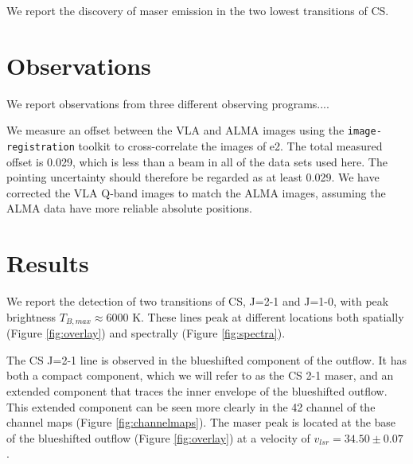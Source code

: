 \documentclass[twocolumn]{aastex62}
\begin{document}
We report the discovery of maser emission in the two lowest transitions of CS.

\section{Observations}
We report observations from three different observing programs....

We measure an offset between the VLA and ALMA images using
the \texttt{image-registration} toolkit to cross-correlate the images
of e2.  The total measured offset is 0.029\arcsec, which is less than
a beam in all of the data sets used here.  The pointing uncertainty should
therefore be regarded as at least 0.029\arcsec.  We have corrected
the VLA Q-band images to match the ALMA images, assuming the ALMA
data have more reliable absolute positions.

\section{Results}
We report the detection of two transitions of CS, J=2-1 and J=1-0, with
peak brightness $T_{B,max}\approx6000$ K.
These lines peak at different locations both spatially (Figure
\ref{fig:overlay}) and spectrally (Figure \ref{fig:spectra}).

The CS J=2-1 line is observed in the blueshifted component of the outflow.
It has both a compact component, which we will refer to as the CS 2-1 maser,
and an extended component that traces the inner envelope of the blueshifted
outflow.  This extended component can be seen more clearly in the 42 \kms
channel of the channel maps (Figure \ref{fig:channelmaps}).  The maser
peak is located at the base of the blueshifted outflow (Figure
\ref{fig:overlay}) at a velocity of $v_{lsr}=34.50\pm0.07$ \kms.
\end{document}
